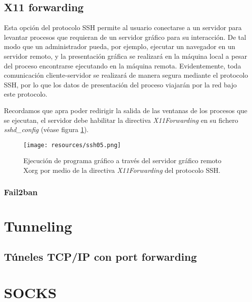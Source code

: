 \documentclass[a4paper, 11pt, titlepage]{article}
\begin{document}
    \subsection{X11 forwarding}\label{X11Forwarding}

        Esta opción del protocolo SSH permite al usuario conectarse a un servidor para levantar procesos 
        que requieran de un servidor gráfico para su interacción. De tal modo que un administrador pueda, 
        por ejemplo, ejecutar un navegador en un servidor remoto, y la presentación gráfica se realizará 
        en la máquina local a pesar del proceso encontrarse ejecutando en la máquina remota. Evidentemente, 
        toda comunicación cliente-servidor se realizará de manera segura mediante el protocolo SSH, por lo que 
        los datos de presentación del proceso viajarán por la red bajo este protocolo.

        Recordamos que apra poder redirigir la salida de las ventanas de los procesos que se ejecutan, el servidor 
        debe habilitar la directiva \textit{X11Forwarding} en su fichero \textit{sshd\_config} (véase 
        figura \ref{ssh05}).

        \begin{figure}[htp]
            \centering
            \texttt{[image: resources/ssh05.png]}
            \caption{Ejecución de programa gráfico a través del servidor gráfico remoto Xorg por medio 
            de la directiva \textit{X11Forwarding} del protocolo SSH.}
            \label{ssh05}
        \end{figure}


    \subsubsection{Fail2ban}
\section{Tunneling}
    \subsection{Túneles TCP/IP con port forwarding}
\section{SOCKS}
\end{document}

